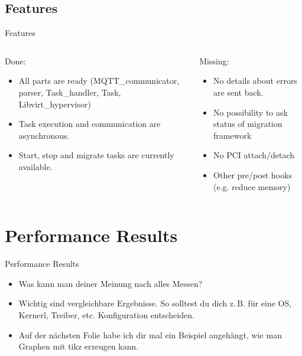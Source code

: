 \documentclass[10pt, aspectratio=1610]{beamer}
\begin{document}
\subsection{Features}
\begin{frame}{Features}
	\begin{columns}[T]
		\begin{column}{.40\textwidth}
			Done:
			\begin{itemize}
				\item All parts are ready (MQTT\_communicator, parser, Task\_handler, Task, Libvirt\_hypervisor)
				\item Task execution and communication are asynchronous.
				\item Start, stop and migrate tasks are currently available.
			\end{itemize}
		\end{column}
		\begin{column}{.40\textwidth}
		Missing:
		\begin{itemize}
			\item No details about errors are sent back.
			\item No possibility to ask status of migration framework
			\item No PCI attach/detach
			\item Other pre/post hooks (e.g. reduce memory)
		\end{itemize}
		\end{column}
	\end{columns}
\end{frame}

\section{Performance Results}
\migrationTime
\begin{frame}{Performance Results}
	\begin{itemize}
		\item Was kann man deiner Meinung nach alles Messen?
		\item Wichtig sind vergleichbare Ergebnisse.
			So solltest du dich z.\,B. für eine OS, Kernerl, Treiber, etc. Konfiguration entscheiden.
		\item Auf der nächsten Folie habe ich dir mal ein Beispiel angehängt, wie man Graphen mit tikz erzeugen kann.
	\end{itemize}
\end{frame}
\end{document}
